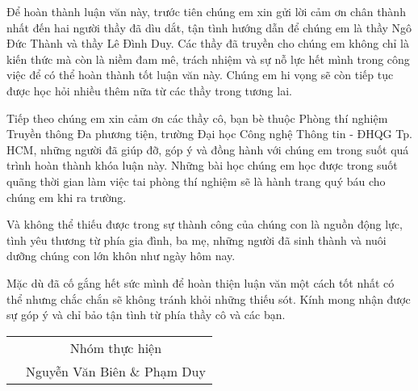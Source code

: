  
 
\begin{acknowledgements}      

Để hoàn thành luận văn này, trước tiên chúng em xin gửi lời cảm ơn chân thành nhất đến hai người thầy đã dìu dắt, tận tình hướng dẫn để chúng em là thầy Ngô Đức Thành và thầy Lê Đình Duy. Các thầy đã truyền cho chúng em không chỉ là kiến thức mà còn là niềm đam mê, trách nhiệm và sự nỗ lực hết mình trong công việc để có thể hoàn thành tốt luận văn này. Chúng em hi vọng sẽ còn tiếp tục được học hỏi nhiều thêm nữa từ các thầy trong tương lai.

Tiếp theo chúng em xin cảm ơn các thầy cô, bạn bè thuộc Phòng thí nghiệm Truyền thông Đa phương tiện, trường Đại học Công nghệ Thông tin - ĐHQG Tp. HCM, những người đã giúp đỡ, góp ý và đồng hành với chúng em trong suốt quá trình hoàn thành khóa luận này. Những bài học chúng em học được trong suốt quãng thời gian làm việc tai phòng thí nghiệm sẽ là hành trang quý báu cho chúng em khi ra trường.

Và không thể thiếu được trong sự thành công của chúng con là nguồn động lực, tình yêu thương từ phía gia đình, ba mẹ, những người đã sinh thành và nuôi dưỡng chúng con lớn khôn như ngày hôm nay.

Mặc dù đã cố gắng hết sức mình để hoàn thiện luận văn một cách tốt nhất có thể nhưng chắc chắn sẽ không tránh khỏi những thiếu sót. Kính mong nhận được sự góp ý và chỉ bảo tận tình từ phía thầy cô và các bạn.

\FloatBarrier
\begin{table}
\begin{center}
	\begin{tabular}{p{6cm} c}
	 & Nhóm thực hiện \\
     & Nguyễn Văn Biên \& Phạm Duy \\
	\end{tabular}
\end{center}
\end{table}
\FloatBarrier

\end{acknowledgements}
  